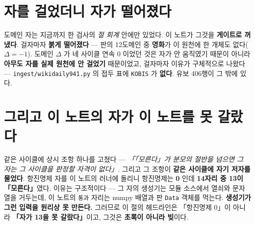 \documentclass[10pt]{article}
\begin{document}

\section{자를 걸었더니 자가 떨어졌다}

도메인 자는 지금까지 한 검사의 \emph{절 회계} 안에만 있었다. 이 노트가 그것을
\textbf{게이트로 꺼냈다}. 걸자마자 \textbf{붉게 떨어졌다} --- 판의 12도메인 중
\textbf{영화}가 이 원천에 한 개체도 없다($\Delta = -1$). 도메인 $\Delta$ 가 네
사이클 연속 0 이었던 것은 자가 안 움직였기 때문이 아니라 \textbf{아무도 자를 실제
원천에 안 걸었기} 때문이었고, 걸자마자 이유가 구체적으로 나왔다 ---
\texttt{ingest/wikidaily941.py} 의 접두 표에 \texttt{KOBIS} 가 \textbf{없다}.
유보 406행이 그 밖에 있다.

\section{그리고 이 노트의 자가 이 노트를 못 갈랐다}

같은 사이클에 상시 조항 하나를 고쳤다 --- \emph{「「모른다」가 분모의 절반을 넘으면
그 자는 그 사이클을 판정할 자격이 없다」}. 그리고 그 조항이 \textbf{같은 사이클에
자기 저자를 물었다}. 항진명제 자를 이 노트의 러너에 돌리니 항진명제는 \textbf{0}
인데 \textbf{14자리 중 13이 「모른다」}였다. 이유는 구조적이다 --- 그 자의 생성기는
모듈 소스에서 열쇠와 문자열을 거두는데, 이 노트의 \texttt{통과} 자리는 numpy
배열과 판 \texttt{Data} 객체를 먹는다. \textbf{생성기가 그런 입력을 원리상 못
만든다.} 그러므로 이 절의 헤드라인은 「항진명제 0」이 아니라 \textbf{「자가 13을 못
갈랐다」}이고, 그것은 \textbf{초록이 아니라 빚}이다.
\end{document}
